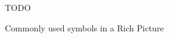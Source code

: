 \begin{figure}
  \centering
  TODO
  \caption{Commonly used symbols in a Rich Picture}
  \label{fig:rich_symbols}
\end{figure}
